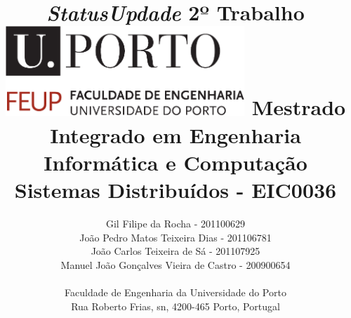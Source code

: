 \documentclass[12pt]{article}
\begin{document}
\setlength{\textwidth}{16cm}
\setlength{\textheight}{22cm}
\title{\Huge\textbf{\textit{StatusUpdade}}\linebreak
\Large\textbf{2º Trabalho}\linebreak\linebreak\linebreak
\includegraphics[width=9cm]{feup.pdf}\linebreak \linebreak
\Large{Mestrado Integrado em Engenharia Informática e Computação} \linebreak
\Large{Sistemas Distribuídos - EIC0036}\linebreak
}
\author{
Gil Filipe da Rocha - 201100629\\João Pedro Matos Teixeira Dias - 201106781\\
João Carlos Teixeira de Sá - 201107925
\\Manuel João Gonçalves Vieira de Castro - 200900654
\\
 \\ Faculdade de Engenharia da Universidade do Porto \\ Rua Roberto Frias, s\/n, 4200-465 Porto, Portugal
 \vspace{1cm}}
\maketitle
\thispagestyle{empty}


\newpage

\tableofcontents


\end{document}
